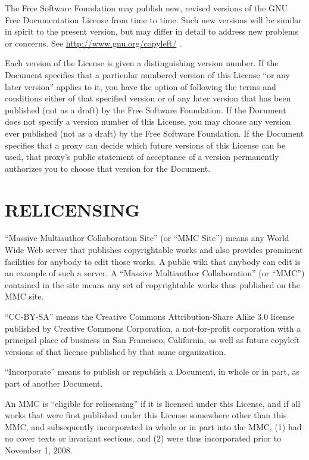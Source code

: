 \documentclass[a4paper,12pt]{book}
\theoremstyle{mes_exemples}	\newtheorem{exemple}[numtho]{Exemple}
\theoremstyle{mes_tho}
\begin{document}
The Free Software Foundation may publish new, revised versions
of the GNU Free Documentation License from time to time.  Such new
versions will be similar in spirit to the present version, but may
differ in detail to address new problems or concerns.  See
\href{http://www.gnu.org/copyleft/}{http://www.gnu.org/copyleft/} .

Each version of the License is given a distinguishing version number.
If the Document specifies that a particular numbered version of this
License ``or any later version'' applies to it, you have the option of
following the terms and conditions either of that specified version or
of any later version that has been published (not as a draft) by the
Free Software Foundation.  If the Document does not specify a version
number of this License, you may choose any version ever published (not
as a draft) by the Free Software Foundation.  If the Document
specifies that a proxy can decide which future versions of this
License can be used, that proxy's public statement of acceptance of a
version permanently authorizes you to choose that version for the
Document.

\section{RELICENSING}


``Massive Multiauthor Collaboration Site'' (or ``MMC Site'') means any
World Wide Web server that publishes copyrightable works and also
provides prominent facilities for anybody to edit those works.  A
public wiki that anybody can edit is an example of such a server.  A
``Massive Multiauthor Collaboration'' (or ``MMC'') contained in the
site means any set of copyrightable works thus published on the MMC
site.

``CC-BY-SA'' means the Creative Commons Attribution-Share Alike 3.0
license published by Creative Commons Corporation, a not-for-profit
corporation with a principal place of business in San Francisco,
California, as well as future copyleft versions of that license
published by that same organization.

``Incorporate'' means to publish or republish a Document, in whole or
in part, as part of another Document.

An MMC is ``eligible for relicensing'' if it is licensed under this
License, and if all works that were first published under this License
somewhere other than this MMC, and subsequently incorporated in whole
or in part into the MMC, (1) had no cover texts or invariant sections,
and (2) were thus incorporated prior to November 1, 2008.
\end{document}
